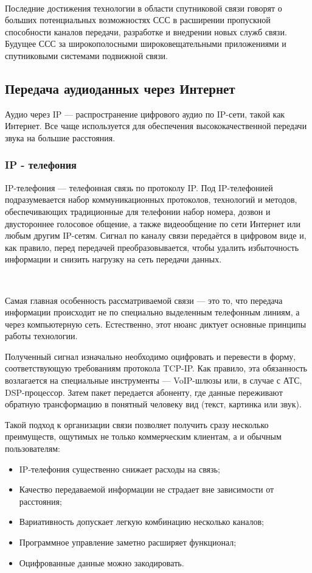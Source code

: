 \documentclass[a4paper]{report}
\begin{document}
~

Последние достижения технологии в области спутниковой связи говорят о больших потенциальных возможностях ССС в расширении пропускной способности каналов передачи, разработке и внедрении новых служб связи. Будущее ССС за широкополосными широковещательными приложениями и спутниковыми системами подвижной связи.


\subsection{Передача аудиоданных через Интернет}
Аудио через IP — распространение цифрового аудио по IP-сети, такой как Интернет. Все чаще используется для обеспечения высококачественной передачи звука на большие расстояния.

\subsubsection{IP - телефония}

IP-телефония — телефонная связь по протоколу IP. Под IP-телефонией подразумевается набор коммуникационных протоколов, технологий и методов, обеспечивающих традиционные для телефонии набор номера, дозвон и двустороннее голосовое общение, а также видеообщение по сети Интернет или любым другим IP-сетям. Сигнал по каналу связи передаётся в цифровом виде и, как правило, перед передачей преобразовывается, чтобы удалить избыточность информации и снизить нагрузку на сеть передачи данных.

~

Самая главная особенность рассматриваемой связи — это то, что передача информации происходит не по специально выделенным телефонным линиям, а через компьютерную сеть. Естественно, этот нюанс диктует основные принципы работы технологии.

Полученный сигнал изначально необходимо оцифровать и перевести в форму, соответствующую требованиям протокола TCP-IP. Как правило, эта обязанность возлагается на специальные инструменты — VoIP-шлюзы или, в случае с АТС, DSP-процессор. Затем пакет передается абоненту, где данные переживают обратную трансформацию в понятный человеку вид (текст, картинка или звук).

Такой подход к организации связи позволяет получить сразу несколько преимуществ, ощутимых не только коммерческим клиентам, а и обычным пользователям:
\begin{itemize}
\item IP-телефония существенно снижает расходы на связь;
\item Качество передаваемой информации не страдает вне зависимости от расстояния;
\item Вариативность допускает легкую комбинацию несколько каналов;
\item Программное управление заметно расширяет функционал;
\item Оцифрованные данные можно закодировать.
\end{itemize}
\end{document}
